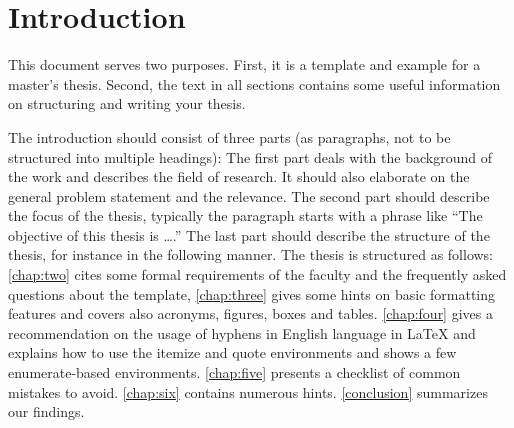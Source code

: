 \chapter{Introduction}
\label{chap:one}

This document serves two purposes. First, it is a template and example for a master's thesis. Second, the text in all sections contains some useful information on structuring and writing your thesis.

The introduction should consist of three parts (as paragraphs, not to be structured into multiple headings): The first part deals with the background of the work and describes the field of research. It should also elaborate on the general problem statement and the relevance. The second part should describe the focus of the thesis, typically the paragraph starts with a phrase like ``The objective of this thesis is \ldots.'' The last part should describe the structure of the thesis, for instance in the following manner. The thesis is structured as follows: \autoref{chap:two} cites some formal requirements of the faculty and the frequently asked questions about the template, \autoref{chap:three} gives some hints on basic formatting features and covers also acronyms, figures, boxes and tables. \autoref{chap:four} gives a recommendation on the usage of hyphens in English language in \LaTeX{} and explains how to use the itemize and quote environments and shows a few enumerate-based environments. \autoref{chap:five} presents a checklist of common mistakes to avoid. \autoref{chap:six} contains numerous hints. \autoref{conclusion} summarizes our findings.
